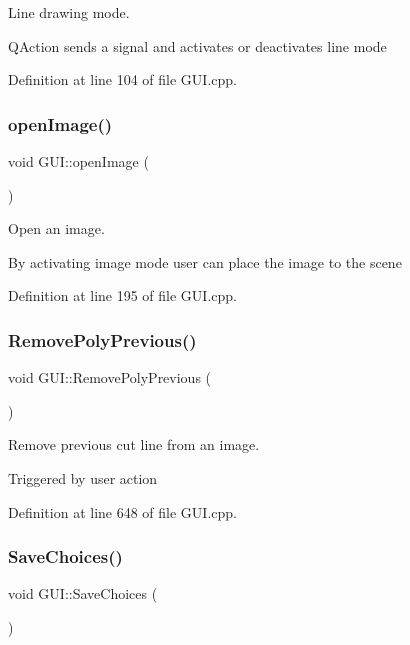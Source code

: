 Line drawing mode. 

Q\+Action sends a signal and activates or deactivates line mode 

Definition at line 104 of file G\+U\+I.\+cpp.

\mbox{\label{classGUI_a925c89bd7b32ccc8d726063ed8076f8f}} 
\subsubsection{\texorpdfstring{open\+Image()}{openImage()}}
{\footnotesize\ttfamily void G\+U\+I\+::open\+Image (\begin{DoxyParamCaption}{ }\end{DoxyParamCaption})}



Open an image. 

By activating image mode user can place the image to the scene 

Definition at line 195 of file G\+U\+I.\+cpp.

\mbox{\label{classGUI_abf8e1050ae4d599bf35af7b1f841d960}} 
\subsubsection{\texorpdfstring{Remove\+Poly\+Previous()}{RemovePolyPrevious()}}
{\footnotesize\ttfamily void G\+U\+I\+::\+Remove\+Poly\+Previous (\begin{DoxyParamCaption}{ }\end{DoxyParamCaption})}



Remove previous cut line from an image. 

Triggered by user action 

Definition at line 648 of file G\+U\+I.\+cpp.

\mbox{\label{classGUI_a00fb847ea0a8249acaaf70c0f3ba3fd4}} 
\subsubsection{\texorpdfstring{Save\+Choices()}{SaveChoices()}}
{\footnotesize\ttfamily void G\+U\+I\+::\+Save\+Choices (\begin{DoxyParamCaption}{ }\end{DoxyParamCaption})}



